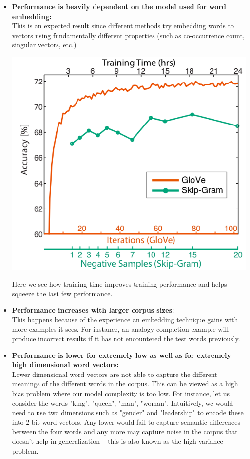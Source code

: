 \documentclass{tufte-handout}
\begin{document}
\begin{itemize}
\item \textbf{Performance is heavily dependent on the model used for word embedding:}\\ This is an expected result since different methods try embedding words to vectors using fundamentally different properties (such as co-occurrence count, singular vectors, etc.)


\begin{marginfigure}%
  \includegraphics[width=\linewidth]{TrainTime}
  \caption{Here we see how training time improves training performance and helps squeeze the last few performance.}
  \label{fig:IntrinsicEval}
\end{marginfigure}


\item \textbf{Performance increases with larger corpus sizes:}\\ This happens because of the experience an embedding technique gains with more examples it sees. For instance, an analogy completion example will produce incorrect results if it has not encountered the test words previously.


\item \textbf{Performance is lower for extremely low as well as for extremely high dimensional word vectors:}\\ Lower dimensional word vectors are not able to capture the different meanings of the different words in the corpus. This can be viewed as a high bias problem where our model complexity is too low. For instance, let us consider the words "king", "queen", "man", "woman". Intuitively, we would need to use two dimensions such as "gender" and "leadership" to encode these into 2-bit word vectors. Any lower would fail to capture semantic differences between the four words and any more may capture noise in the corpus that doesn't help in generalization -- this is also known as the high variance problem.
\end{itemize}
\end{document}
